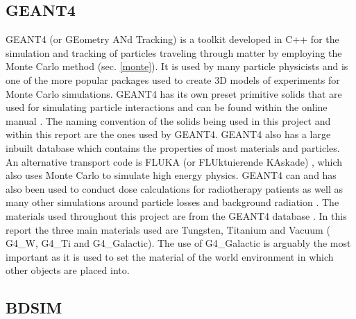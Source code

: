 \documentclass[12pt,a4paper]{article}
\begin{document}

\subsection{GEANT4}\label{GEANT4}
\label{g4}
GEANT4 (or GEometry ANd Tracking) \cite{geant} is a toolkit developed in C++ for the simulation and tracking of particles traveling through matter by employing the Monte Carlo method (sec. \ref{monte}). It is used by many particle physicists and is one of the more popular packages used to create 3D models of experiments for Monte Carlo simulations. GEANT4 has its own preset primitive solids that are used for simulating particle interactions and can be found within the online manual \cite{solids}. The naming convention of the solids being used in this project and within this report are the ones used by GEANT4. GEANT4 also has a large inbuilt database which contains the properties of most materials and particles. An alternative transport code is FLUKA (or FLUktuierende KAskade) \cite{fluka}, which also uses Monte Carlo to simulate high energy physics. GEANT4 can and has also been used to conduct dose calculations for radiotherapy patients \cite{dose} as well as many other simulations around particle losses and background radiation \cite{will}. The materials used throughout this project are from the GEANT4 database \cite{mater}. In this report the three main materials used are Tungsten, Titanium and Vacuum ( G4\_W, G4\_Ti and G4\_Galactic). The use of G4\_Galactic is arguably the most important as it is used to set the material of the world environment in which other objects are placed into.


\subsection{BDSIM}
\label{bdsim}
\end{document}
